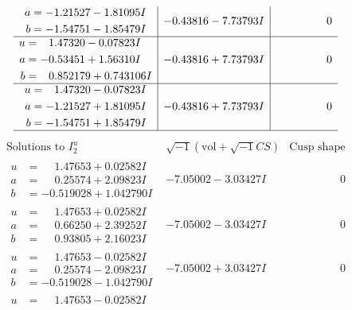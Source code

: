 \documentclass[1p]{elsarticle_modified}
\theoremstyle{definition}
\newcommand{\I}{\sqrt{-1}}
\begin{document}
$$\begin{array}{c|c|c}
\begin{aligned}
a &= -1.21527 - 1.81095 I \\
b &= -1.54751 - 1.85479 I\end{aligned}
 & -0.43816 - 7.73793 I & \phantom{-0.000000 } 0 \\ \hline\begin{aligned}
u &= \phantom{-}1.47320 - 0.07823 I \\
a &= -0.53451 + 1.56310 I \\
b &= \phantom{-}0.852179 + 0.743106 I\end{aligned}
 & -0.43816 + 7.73793 I & \phantom{-0.000000 } 0 \\ \hline\begin{aligned}
u &= \phantom{-}1.47320 - 0.07823 I \\
a &= -1.21527 + 1.81095 I \\
b &= -1.54751 + 1.85479 I\end{aligned}
 & -0.43816 + 7.73793 I & \phantom{-0.000000 } 0\\
 \hline 
 \end{array}$$\newpage$$\begin{array}{c|c|c}  
\text{Solutions to }I^u_{2}& \I (\text{vol} + \sqrt{-1}CS) & \text{Cusp shape}\\
 \hline 
\begin{aligned}
u &= \phantom{-}1.47653 + 0.02582 I \\
a &= \phantom{-}0.25574 + 2.09823 I \\
b &= -0.519028 + 1.042790 I\end{aligned}
 & -7.05002 - 3.03427 I & \phantom{-0.000000 } 0 \\ \hline\begin{aligned}
u &= \phantom{-}1.47653 + 0.02582 I \\
a &= \phantom{-}0.66250 + 2.39252 I \\
b &= \phantom{-}0.93805 + 2.16023 I\end{aligned}
 & -7.05002 - 3.03427 I & \phantom{-0.000000 } 0 \\ \hline\begin{aligned}
u &= \phantom{-}1.47653 - 0.02582 I \\
a &= \phantom{-}0.25574 - 2.09823 I \\
b &= -0.519028 - 1.042790 I\end{aligned}
 & -7.05002 + 3.03427 I & \phantom{-0.000000 } 0 \\ \hline\begin{aligned}
u &= \phantom{-}1.47653 - 0.02582 I \\

\end{aligned}
\end{array}$$
\end{document}
